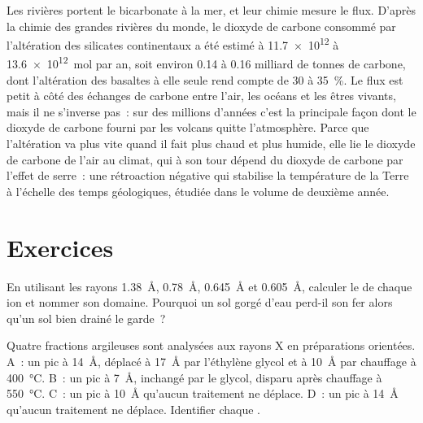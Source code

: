 Les rivières portent le bicarbonate à la mer, et leur chimie mesure le flux.
D'après la chimie des grandes rivières du monde, le dioxyde de carbone consommé par
l'altération des silicates continentaux a été estimé à \num{11.7e12} à
\qty{13.6e12}{mol} par an, soit environ 0.14 à 0.16 milliard de tonnes de carbone, dont
l'altération des basaltes à elle seule rend compte de 30 à \qty{35}{\percent}. Le flux est petit à côté
des échanges de carbone entre l'air, les océans et les êtres vivants, mais il
ne s'inverse pas~: sur des millions d'années c'est la principale façon dont le dioxyde de carbone
fourni par les volcans quitte l'atmosphère. Parce que l'altération va plus vite quand
il fait plus chaud et plus humide, elle lie le dioxyde de carbone de l'air au climat,
qui à son tour dépend du dioxyde de carbone par l'effet de serre~: une
rétroaction négative qui stabilise la température de la Terre à l'échelle des temps
géologiques, étudiée dans le volume de deuxième année.

\section{Exercices}

\begin{exercise}[$\star$]\label{exo:b1:weathering-clays:1}
En utilisant les rayons  \qty{1.38}{\angstrom},  \qty{0.78}{\angstrom},
 \qty{0.645}{\angstrom} et  \qty{0.605}{\angstrom}, calculer
le  de chaque ion et nommer son domaine. Pourquoi un sol gorgé d'eau
perd-il son fer alors qu'un sol bien drainé le garde~?
\end{exercise}

\begin{exercise}[$\star$]\label{exo:b1:weathering-clays:2}
Quatre fractions argileuses sont analysées aux rayons X en préparations orientées. A~: un pic à
\SI{14}{\angstrom}, déplacé à \SI{17}{\angstrom} par l'éthylène glycol et à
\SI{10}{\angstrom} par chauffage à \SI{400}{\celsius}. B~: un pic à
\SI{7}{\angstrom}, inchangé par le glycol, disparu après chauffage à
\SI{550}{\celsius}. C~: un pic à \SI{10}{\angstrom} qu'aucun traitement ne déplace. D~:
un pic à \SI{14}{\angstrom} qu'aucun traitement ne déplace. Identifier chaque .
\end{exercise}

